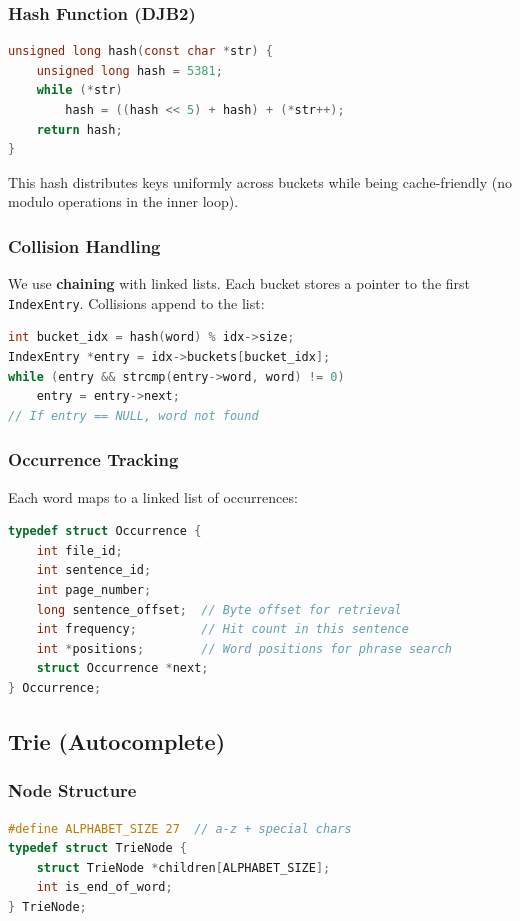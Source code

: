 \documentclass[12pt,a4paper]{article}
\begin{document}
\subsubsection{Hash Function (DJB2)}
\begin{lstlisting}[language=C]
unsigned long hash(const char *str) {
    unsigned long hash = 5381;
    while (*str)
        hash = ((hash << 5) + hash) + (*str++);
    return hash;
}
\end{lstlisting}

This hash distributes keys uniformly across buckets while being cache-friendly (no modulo operations in the inner loop).

\subsubsection{Collision Handling}
We use \textbf{chaining} with linked lists. Each bucket stores a pointer to the first \texttt{IndexEntry}. Collisions append to the list:

\begin{lstlisting}[language=C]
int bucket_idx = hash(word) % idx->size;
IndexEntry *entry = idx->buckets[bucket_idx];
while (entry && strcmp(entry->word, word) != 0)
    entry = entry->next;
// If entry == NULL, word not found
\end{lstlisting}

\subsubsection{Occurrence Tracking}
Each word maps to a linked list of occurrences:

\begin{lstlisting}[language=C]
typedef struct Occurrence {
    int file_id;
    int sentence_id;
    int page_number;
    long sentence_offset;  // Byte offset for retrieval
    int frequency;         // Hit count in this sentence
    int *positions;        // Word positions for phrase search
    struct Occurrence *next;
} Occurrence;
\end{lstlisting}

\subsection{Trie (Autocomplete)}

\subsubsection{Node Structure}
\begin{lstlisting}[language=C]
#define ALPHABET_SIZE 27  // a-z + special chars
typedef struct TrieNode {
    struct TrieNode *children[ALPHABET_SIZE];
    int is_end_of_word;
} TrieNode;
\end{lstlisting}
\end{document}
